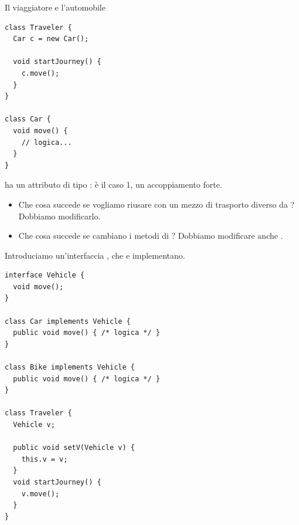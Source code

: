\begin{esempio}{Il viaggiatore e l'automobile}
\noindent\begin{minipage}[c]{0.5\textwidth}
\begin{lstlisting}[style=java]
class Traveler {
  Car c = new Car();

  void startJourney() {
    c.move();
  }
}

class Car {
  void move() {
    // logica...
  }
}
\end{lstlisting}
\end{minipage}\hfill
\begin{minipage}[c]{0.46\textwidth}
\centering
{}
\end{minipage}

 ha un attributo di tipo : è il caso 1, un accoppiamento forte.
\begin{itemize}
  \item Che cosa succede se vogliamo riusare  con un mezzo di trasporto diverso da ? Dobbiamo
        modificarlo.
  \item Che cosa succede se cambiano i metodi di ? Dobbiamo modificare anche .
\end{itemize}

Introduciamo un'interfaccia , che  e  implementano.

\noindent\begin{minipage}[c]{0.5\textwidth}
\begin{lstlisting}[style=java]
interface Vehicle {
  void move();
}

class Car implements Vehicle {
  public void move() { /* logica */ }
}

class Bike implements Vehicle {
  public void move() { /* logica */ }
}

class Traveler {
  Vehicle v;

  public void setV(Vehicle v) {
    this.v = v;
  }
  void startJourney() {
    v.move();
  }
}
\end{lstlisting}
\end{minipage}\hfill
\begin{minipage}[c]{0.46\textwidth}
\centering
{}


\end{minipage}
\end{esempio}
